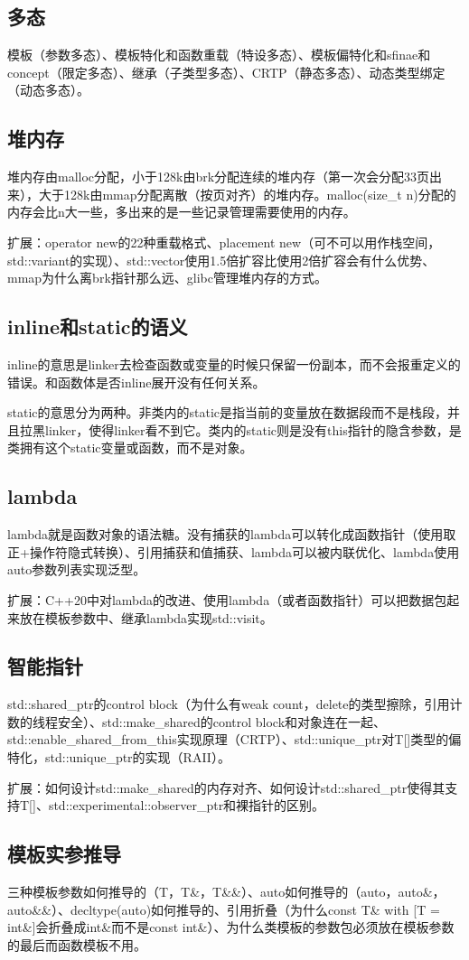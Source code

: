 \subsection{多态}

模板（参数多态）、模板特化和函数重载（特设多态）、模板偏特化和sfinae和concept（限定多态）、继承（子类型多态）、CRTP（静态多态）、动态类型绑定（动态多态）。

\subsection{堆内存}

堆内存由malloc分配，小于128k由brk分配连续的堆内存（第一次会分配33页出来），大于128k由mmap分配离散（按页对齐）的堆内存。malloc(size\_t n)分配的内存会比n大一些，多出来的是一些记录管理需要使用的内存。

扩展：operator new的22种重载格式、placement new（可不可以用作栈空间，std::variant的实现）、std::vector使用1.5倍扩容比使用2倍扩容会有什么优势、mmap为什么离brk指针那么远、glibc管理堆内存的方式。

\subsection{inline和static的语义}
inline的意思是linker去检查函数或变量的时候只保留一份副本，而不会报重定义的错误。和函数体是否inline展开没有任何关系。

static的意思分为两种。非类内的static是指当前的变量放在数据段而不是栈段，并且拉黑linker，使得linker看不到它。类内的static则是没有this指针的隐含参数，是类拥有这个static变量或函数，而不是对象。

\subsection{lambda}
lambda就是函数对象的语法糖。没有捕获的lambda可以转化成函数指针（使用取正+操作符隐式转换）、引用捕获和值捕获、lambda可以被内联优化、lambda使用auto参数列表实现泛型。

扩展：C++20中对lambda的改进、使用lambda（或者函数指针）可以把数据包起来放在模板参数中、继承lambda实现std::visit。

\subsection{智能指针}
std::shared\_ptr的control block（为什么有weak count，delete的类型擦除，引用计数的线程安全）、std::make\_shared的control block和对象连在一起、std::enable\_shared\_from\_this实现原理（CRTP）、std::unique\_ptr对T[]类型的偏特化，std::unique\_ptr的实现（RAII）。

扩展：如何设计std::make\_shared的内存对齐、如何设计std::shared\_ptr使得其支持T[]、std::experimental::observer\_ptr和裸指针的区别。

\subsection{模板实参推导}
三种模板参数如何推导的（T，T\&，T\&\&）、auto如何推导的（auto，auto\&，auto\&\&）、decltype(auto)如何推导的、引用折叠（为什么const T\& with [T = int\&]会折叠成int\&而不是const int\&）、为什么类模板的参数包必须放在模板参数的最后而函数模板不用。
